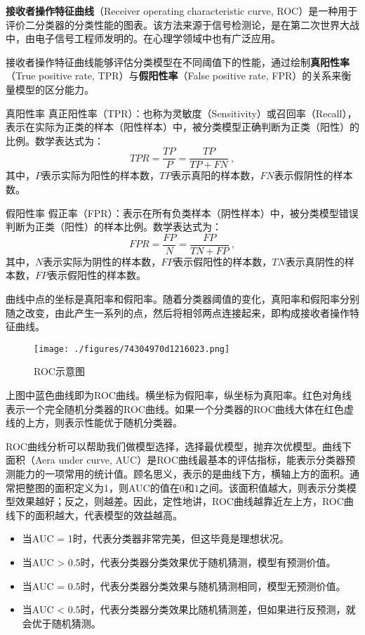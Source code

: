 

\textbf{接收者操作特征曲线}（Receiver operating characteristic curve, ROC）是一种用于评价二分类器的分类性能的图表。该方法来源于信号检测论，是在第二次世界大战中，由电子信号工程师发明的。在心理学领域中也有广泛应用。

接收者操作特征曲线能够评估分类模型在不同阈值下的性能，通过绘制\textbf{真阳性率}（True positive rate, TPR）与\textbf{假阳性率}（False positive rate, FPR）的关系来衡量模型的区分能力。

\begin{definition}{真阳性率}
真正阳性率（TPR）：也称为灵敏度（Sensitivity）或召回率（Recall），表示在实际为正类的样本（阳性样本）中，被分类模型正确判断为正类（阳性）的比例。数学表达式为：
\begin{equation}
TPR=\frac{TP}{P}=\frac{TP}{TP+FN}~,
\end{equation}
其中，$P$表示实际为阳性的样本数，$TP$表示真阳的样本数，$FN$表示假阴性的样本数。
\end{definition}

\begin{definition}{假阳性率}
假正率（FPR）：表示在所有负类样本（阴性样本）中，被分类模型错误判断为正类（阳性）的样本比例。数学表达式为：
\begin{equation}
FPR=\frac{FP}{N}=\frac{FP}{TN+FP}~,
\end{equation}
其中，$N$表示实际为阴性的样本数，$FP$表示假阳性的样本数，$TN$表示真阴性的样本数，$FP$表示假阳性的样本数。
\end{definition}

曲线中点的坐标是真阳率和假阳率。随着分类器阈值的变化，真阳率和假阳率分别随之改变，由此产生一系列的点，然后将相邻两点连接起来，即构成接收者操作特征曲线。

\begin{figure}[ht]
\centering
\texttt{[image: ./figures/74304970d1216023.png]}
\caption{ROC示意图} \label{fig_ROC_1}
\end{figure}
上图中蓝色曲线即为ROC曲线。横坐标为假阳率，纵坐标为真阳率。红色对角线表示一个完全随机分类器的ROC曲线。如果一个分类器的ROC曲线大体在红色虚线的上方，则表示性能优于随机分类器。

ROC曲线分析可以帮助我们做模型选择，选择最优模型，抛弃次优模型。曲线下面积（Aera under curve, AUC）是ROC曲线最基本的评估指标，能表示分类器预测能力的一项常用的统计值。顾名思义，表示的是曲线下方，横轴上方的面积。通常把整图的面积定义为1，则AUC的值在$0$和$1$之间。该面积值越大，则表示分类模型效果越好；反之，则越差。因此，定性地讲，ROC曲线越靠近左上方，ROC曲线下的面积越大，代表模型的效益越高。

\begin{itemize}
\item 当AUC = 1时，代表分类器非常完美，但这毕竟是理想状况。
\item 当AUC > 0.5时，代表分类器分类效果优于随机猜测，模型有预测价值。
\item 当AUC = 0.5时，代表分类器分类效果与随机猜测相同，模型无预测价值。
\item 当AUC < 0.5时，代表分类器分类效果比随机猜测差，但如果进行反预测，就会优于随机猜测。
\end{itemize}